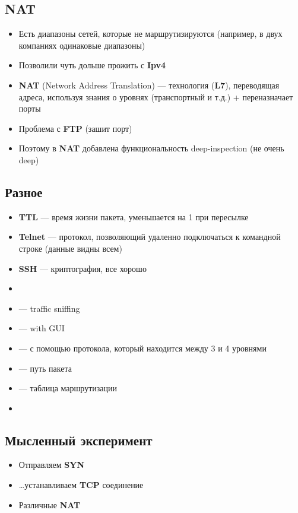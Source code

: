 \documentclass[../../lectures.tex]{subfiles}
\begin{document}
\newpage
\subsection{NAT}
\begin{itemize}
    \item Есть диапазоны сетей, которые не маршрутизируются (например, в двух компаниях одинаковые диапазоны)
    \item Позволили чуть дольше прожить с \textbf{Ipv4}
    \item \textbf{NAT} (Network Address Translation) --- технология (\textbf{L7}),  переводящая адреса, используя знания о уровнях (транспортный и т.д.) + переназначает порты
    \item Проблема с \textbf{FTP} (зашит порт)
    \item Поэтому в \textbf{NAT} добавлена функциональность deep-inspection (не очень deep)
\end{itemize}

\subsection{Разное}
\begin{itemize}
    \item \textbf{TTL} --- время жизни пакета, уменьшается на 1 при пересылке
    \item \textbf{Telnet} --- протокол, позволяющий удаленно подключаться к командной строке (данные видны всем)
    \item \textbf{SSH} --- криптография, все хорошо
    \item {}
    \item {} --- traffic sniffing
    \item {} --- with GUI
    \item {} --- с помощью протокола, который находится между 3 и 4 уровнями
    \item {} --- путь пакета
    \item {} --- таблица маршрутизации
    \item {}
\end{itemize}

\subsection{Мысленный эксперимент}
\begin{itemize}
    \item Отправляем \textbf{SYN}
    \item \dots устанавливаем \textbf{TCP} соединение
    \item Различные \textbf{NAT}
\end{itemize}
\end{document}
